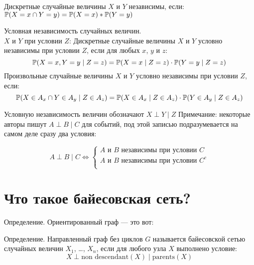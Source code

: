Дискретные случайные величины $X$ и $Y$ независимы, если: 
$\P(X=x \cap Y=y)=\P(X=x)*\P(Y=y)$

Условная независимость случайных величин.\\ $X$ и $Y$ при условии $Z$:
Дискретные случайные величины $X$ и $Y$ условно независимы при условии $Z$, если для любых $x$, $y$ и $z$:
\begin{equation}
\P(X=x,Y=y \mid Z=z) = \P(X=x \mid Z=z)\cdot \P(Y=y \mid Z=z)
\end{equation}
Произвольные случайные величины $X$ и $Y$ условно независимы при условии $Z$, если:
\begin{equation}
\P(X \in A_x \cap Y \in  A_y\mid Z \in A_z) = \P(X \in A_x \mid Z \in A_z)\cdot \P(Y \in A_y\mid Z \in A_z)
\end{equation}

Условную независимость величин обозначают $X \perp Y \mid Z$
Примечание: некоторые авторы пишут $A \perp B \mid C$ для событий, под этой записью подразумевается на самом деле сразу два условия:

\begin{equation}
A \perp B \mid C \Leftrightarrow 
\begin{cases}
A \mbox{ и } B \mbox{ независимы при условии } C \\
A \mbox{ и } B \mbox{ независимы при условии } C^c \\
\end{cases}
\end{equation}

\section{Что такое байесовская сеть?}

Определение. Ориентированный граф --- это вот:

Определение. Направленный граф без циклов $G$ называется байесовской сетью случайных величин $X_1$, \ldots, $X_n$, если для любого узла $X$ выполнено условие:
\begin{equation}
X \perp \mbox{non descendant}(X) \mid \mbox{parents}(X)
\end{equation}


